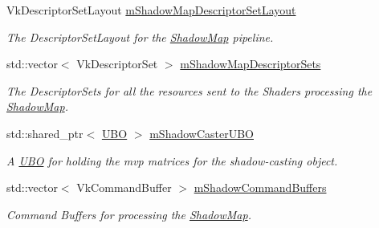 \begin{DoxyCompactItemize}
\mbox{\label{class_render_system_a39ec85f7bd1a226089ba8b6208d4981f}} 
Vk\+Descriptor\+Set\+Layout \mbox{\hyperlink{class_render_system_a39ec85f7bd1a226089ba8b6208d4981f}{m\+Shadow\+Map\+Descriptor\+Set\+Layout}}
\begin{DoxyCompactList}\small\item\em The Descriptor\+Set\+Layout for the \mbox{\hyperlink{struct_shadow_map}{Shadow\+Map}} pipeline. \end{DoxyCompactList}\item 
\mbox{\label{class_render_system_a530a3caa22c225ba859a7398314c0e5e}} 
std\+::vector$<$ Vk\+Descriptor\+Set $>$ \mbox{\hyperlink{class_render_system_a530a3caa22c225ba859a7398314c0e5e}{m\+Shadow\+Map\+Descriptor\+Sets}}
\begin{DoxyCompactList}\small\item\em The Descriptor\+Sets for all the resources sent to the Shaders processing the \mbox{\hyperlink{struct_shadow_map}{Shadow\+Map}}. \end{DoxyCompactList}\item 
\mbox{\label{class_render_system_aed4d1f392fc478f4ef7b02937b09a035}} 
std\+::shared\+\_\+ptr$<$ \mbox{\hyperlink{struct_u_b_o}{U\+BO}} $>$ \mbox{\hyperlink{class_render_system_aed4d1f392fc478f4ef7b02937b09a035}{m\+Shadow\+Caster\+U\+BO}}
\begin{DoxyCompactList}\small\item\em A \mbox{\hyperlink{struct_u_b_o}{U\+BO}} for holding the mvp matrices for the shadow-\/casting object. \end{DoxyCompactList}\item 
\mbox{\label{class_render_system_aa57e2b9702c90f2b27324ffbcc20e4fe}} 
std\+::vector$<$ Vk\+Command\+Buffer $>$ \mbox{\hyperlink{class_render_system_aa57e2b9702c90f2b27324ffbcc20e4fe}{m\+Shadow\+Command\+Buffers}}
\begin{DoxyCompactList}\small\item\em Command Buffers for processing the \mbox{\hyperlink{struct_shadow_map}{Shadow\+Map}}. \end{DoxyCompactList}\item 
\mbox{\label{class_render_system_ab8bf79f6f6de8fab7126a4a02f8afa20}} 

\end{DoxyCompactItemize}
